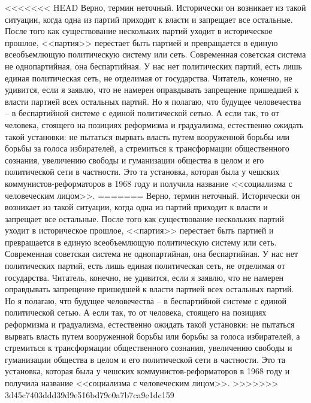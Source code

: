 \documentclass{book}
\begin{document}
<<<<<<< HEAD
Верно, термин неточный. Исторически он возникает из такой ситуации, когда одна из партий приходит к власти и запрещает все остальные. После того как существование нескольких пар­тий уходит в историческое прошлое, <<партия>> перестает быть партией и превращается в единую всеобъемлющую политиче­скую систему или сеть. Современная советская система не одно­партийная, она беспартийная.  У нас нет политических партий, есть лишь единая политическая сеть, не отделимая от государ­ства. Читатель, конечно, не удивится, если я заявлю, что не наме­рен оправдывать запрещение пришедшей к власти партией всех остальных партий. Но я полагаю, что будущее человечества -- в беспартийной системе с единой политической сетью. А если так, то от человека, стоящего на позициях реформизма и градуализма, естественно ожидать такой установки: не пытаться вырвать власть путем вооруженной борьбы или борьбы за го­лоса избирателей, а стремиться к трансформации общественно­го сознания, увеличению свободы и гуманизации общества в целом и его политической сети в частности. Это та установка, которая была у чешских коммунистов‑реформаторов в 1968 го­ду и получила название <<социализма с человеческим лицом>>.
=======
Верно, термин неточный. Исторически он возникает из такой ситуации, когда одна из партий приходит к власти и запрещает все остальные. После того как существование нескольких пар­тий уходит в историческое прошлое, <<партия>> перестает быть партией и превращается в единую всеобъемлющую политиче­скую систему или сеть. Современная советская система не одно­партийная, она беспартийная.  У нас нет политических партий, есть лишь единая политическая сеть, не отделимая от государ­ства. Читатель, конечно, не удивится, если я заявлю, что не наме­рен оправдывать запрещение пришедшей к власти партией всех остальных партий. Но я полагаю, что будущее человечества -- в беспартийной системе с единой политической сетью. А если так, то от человека, стоящего на позициях реформизма и градуализма, естественно ожидать такой установки: не пытаться вырвать власть путем вооруженной борьбы или борьбы за го­лоса избирателей, а стремиться к трансформации общественно­го сознания, увеличению свободы и гуманизации общества в целом и его 
политической сети в частности. Это та установка, которая была у чешских коммунистов-реформаторов в 1968 го­ду и получила название <<социализма с человеческим лицом>>.
>>>>>>> 3d45c7403ddd39d9e516bd79e0a7b7ca9e1dc159
\end{document}
